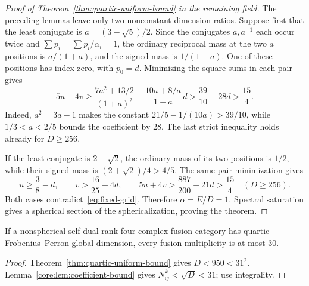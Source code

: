 \begin{proof}[Proof of Theorem~\ref{thm:quartic-uniform-bound} in the remaining field]
The preceding lemmas leave only two nonconstant dimension ratios.
Suppose first that the least conjugate is $a=(3-\sqrt5)/2$.
Since the conjugates $a,a^{-1}$ each occur twice and
$\sum p_i=\sum p_i/\alpha_i=1$, the ordinary reciprocal mass at
the two $a$ positions is $a/(1+a)$, and the signed mass is
$1/(1+a)$. One of these positions has index zero, with $p_0=d$.
Minimizing the square sums in each pair gives
\[
 5u+4v\ge\frac{7a^2+13/2}{(1+a)^2}
 -\frac{10a+8/a}{1+a}\,d
 >\frac{39}{10}-28d>\frac{15}{4}.
\]
Indeed, $a^2=3a-1$ makes the constant $21/5-1/(10a)>39/10$,
while $1/3<a<2/5$ bounds the coefficient by $28$. The last strict
inequality holds already for $D\ge256$.

If the least conjugate is $2-\sqrt2$, the ordinary mass of its two
positions is $1/2$, while their signed mass is
$(2+\sqrt2)/4>4/5$. The same pair minimization gives
\[
 u\ge\frac38-d,\qquad v>\frac{16}{25}-4d,
 \qquad 5u+4v>\frac{887}{200}-21d>\frac{15}{4}
 \quad(D\ge256).
\]
Both cases contradict~\eqref{eq:fixed-grid}. Therefore
$\alpha=E/D=1$. Spectral saturation gives a spherical section of
the sphericalization, proving the theorem.
\end{proof}

\begin{corollary}\label{cor:quartic-multiplicity-bound}
If a nonspherical self-dual rank-four complex fusion category has
quartic Frobenius--Perron global dimension, every fusion multiplicity
is at most $30$.
\end{corollary}
\begin{proof}
Theorem~\ref{thm:quartic-uniform-bound} gives $D<950<31^2$.
Lemma~\ref{core:lem:coefficient-bound} gives
$N_{ij}^{k}<\sqrt D<31$; use integrality.
\end{proof}


